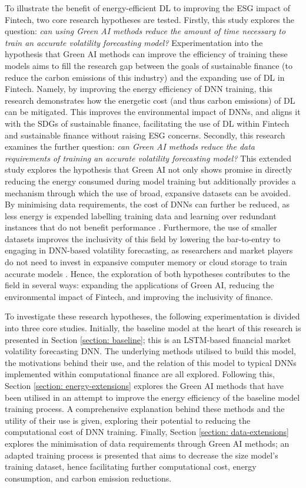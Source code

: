 \documentclass[a4paper, 11pt]{report}
\begin{document}
    To illustrate the benefit of energy-efficient DL to improving the ESG impact of Fintech, two core research hypotheses are tested. Firstly, this study explores the question: \emph{can using Green AI methods reduce the amount of time necessary to train an accurate volatility forecasting model?} Experimentation into the hypothesis that Green AI methods can improve the efficiency of training these models aims to fill the research gap between the goals of sustainable finance (to reduce the carbon emissions of this industry) and the expanding use of DL in Fintech. Namely, by improving the energy efficiency of DNN training, this research demonstrates how the energetic cost (and thus carbon emissions) of DL can be mitigated. This improves the environmental impact of DNNs, and aligns it with the SDGs of sustainable finance, facilitating the use of DL within Fintech and sustainable finance without raising ESG concerns. Secondly, this research examines the further question: \emph{can Green AI methods reduce the data requirements of training an accurate volatility forecasting model?} This extended study explores the hypothesis that Green AI not only shows promise in directly reducing the energy consumed during model training but additionally provides a mechanism through which the use of broad, expansive datasets can be avoided. By minimising data requirements, the cost of DNNs can further be reduced, as less energy is expended labelling training data and learning over redundant instances that do not benefit performance \citep{schwartz-2019}. Furthermore, the use of smaller datasets improves the inclusivity of this field by lowering the bar-to-entry to engaging in DNN-based volatility forecasting, as researchers and market players do not need to invest in expansive computer memory or cloud storage to train accurate models \citep{strubell-2019}. Hence, the exploration of both hypotheses contributes to the field in several ways: expanding the applications of Green AI, reducing the environmental impact of Fintech, and improving the inclusivity of finance.

    To investigate these research hypotheses, the following experimentation is divided into three core studies. Initially, the baseline model at the heart of this research is presented in Section \ref{section: baseline}; this is an LSTM-based financial market volatility forecasting DNN. The underlying methods utilised to build this model, the motivations behind their use, and the relation of this model to typical DNNs implemented within computational finance are all explored. Following this, Section \ref{section: energy-extensions} explores the Green AI methods that have been utilised in an attempt to improve the energy efficiency of the baseline model training process. A comprehensive explanation behind these methods and the utility of their use is given, exploring their potential to reducing the computational cost of DNN training. Finally, Section \ref{section: data-extensions} explores the minimisation of data requirements through Green AI methods; an adapted training process is presented that aims to decrease the size model’s training dataset, hence facilitating further computational cost, energy consumption, and carbon emission reductions.
\end{document}
